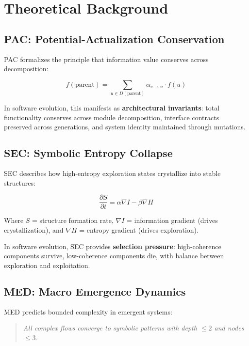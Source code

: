 \documentclass[11pt,a4paper]{article}
\begin{document}
\section{Theoretical Background}

\subsection{PAC: Potential-Actualization Conservation}

PAC formalizes the principle that information value conserves across decomposition:

\begin{equation}
f(\text{parent}) = \sum_{u \in D(\text{parent})} \alpha_{v \rightarrow u} \cdot f(u)
\end{equation}

In software evolution, this manifests as \textbf{architectural invariants}: total functionality conserves across module decomposition, interface contracts preserved across generations, and system identity maintained through mutations.

\subsection{SEC: Symbolic Entropy Collapse}

SEC describes how high-entropy exploration states crystallize into stable structures:

\begin{equation}
\frac{\partial S}{\partial t} = \alpha \nabla I - \beta \nabla H
\end{equation}

Where $S$ = structure formation rate, $\nabla I$ = information gradient (drives crystallization), and $\nabla H$ = entropy gradient (drives exploration).

In software evolution, SEC provides \textbf{selection pressure}: high-coherence components survive, low-coherence components die, with balance between exploration and exploitation.

\subsection{MED: Macro Emergence Dynamics}

MED predicts bounded complexity in emergent systems:

\begin{quote}
\textit{All complex flows converge to symbolic patterns with depth $\leq 2$ and nodes $\leq 3$.}
\end{quote}
\end{document}
